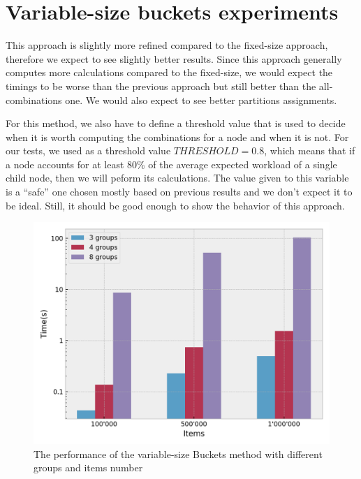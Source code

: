 \section{Variable-size buckets experiments}\label{sec:Variable-Size-buckets-tests}
This approach is slightly more refined compared to the fixed-size approach, therefore we expect to see slightly better results. Since this approach generally computes more calculations compared to the fixed-size, we would expect the timings to be worse than the previous approach but still better than the all-combinations one. We would also expect to see better partitions assignments. 

For this method, we also have to define a threshold value that is used to decide when it is worth computing the combinations for a node and when it is not. For our tests, we used as a threshold value $THRESHOLD = 0.8$, which means that if a node accounts for at least 80\% of the average expected workload of a single child node, then we will peform its calculations. The value given to this variable is a ``safe'' one chosen mostly based on previous results and we don't expect it to be ideal. Still, it should be good enough to show the behavior of this approach.

\begin{figure}[!htb]
  \centering
  \includegraphics[width=\textwidth,height=\textheight,keepaspectratio]{img/dynamic.png}
  \caption{The performance of the variable-size Buckets method with different groups and items number}
  \label{fig:dynamic}
\end{figure}

